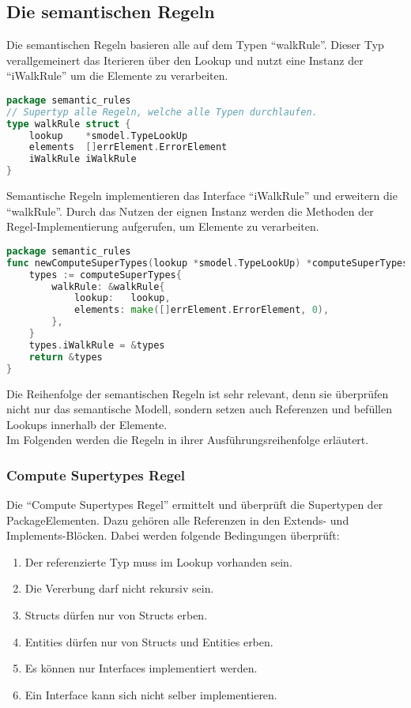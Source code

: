 \documentclass[./einleitung.tex]{subfiles}
\begin{document}
    \subsection{Die semantischen Regeln}\label{subsec:die-semantischen-regeln}
    Die semantischen Regeln basieren alle auf dem Typen ``walkRule''.
    Dieser Typ verallgemeinert das Iterieren über den Lookup und nutzt eine Instanz der ``iWalkRule'' um die Elemente zu verarbeiten.
    \begin{lstlisting}[language=go]
package semantic_rules
// Supertyp alle Regeln, welche alle Typen durchlaufen.
type walkRule struct {
	lookup    *smodel.TypeLookUp
	elements  []errElement.ErrorElement
	iWalkRule iWalkRule
}
    \end{lstlisting}
    Semantische Regeln implementieren das Interface ``iWalkRule'' und erweitern die ``walkRule''.
    Durch das Nutzen der eignen Instanz werden die Methoden der Regel-Implementierung aufgerufen, um Elemente zu verarbeiten.
    \begin{lstlisting}[language=go]
package semantic_rules
func newComputeSuperTypes(lookup *smodel.TypeLookUp) *computeSuperTypes {
	types := computeSuperTypes{
		walkRule: &walkRule{
			lookup:   lookup,
			elements: make([]errElement.ErrorElement, 0),
		},
	}
    types.iWalkRule = &types
    return &types
}\end{lstlisting}

    Die Reihenfolge der semantischen Regeln ist sehr relevant, denn sie überprüfen nicht nur das semantische Modell, sondern setzen auch Referenzen und befüllen Lookups innerhalb der Elemente. \\
    Im Folgenden werden die Regeln in ihrer Ausführungsreihenfolge erläutert.

    \subsubsection{Compute Supertypes Regel}
    Die ``Compute Supertypes Regel'' ermittelt und überprüft die Supertypen der PackageElementen.
    Dazu gehören alle Referenzen in den Extends- und Implements-Blöcken.
    Dabei werden folgende Bedingungen überprüft:
    \begin{enumerate}
        \item Der referenzierte Typ muss im Lookup vorhanden sein.
        \item Die Vererbung darf nicht rekursiv sein.
        \item Structs dürfen nur von Structs erben.
        \item Entities dürfen nur von Structs und Entities erben.
        \item Es können nur Interfaces implementiert werden.
        \item Ein Interface kann sich nicht selber implementieren.
    \end{enumerate}
\end{document}
